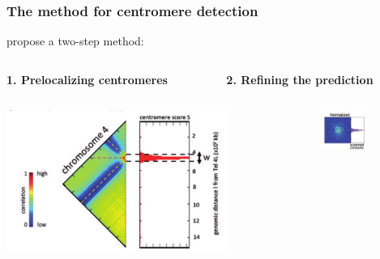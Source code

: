 \documentclass[xcolor=dvipsnames]{beamer}
\begin{document}
\begin{frame}
\frametitle{The \citet{marie-nelly:filling} method for centromere detection}

\citet{marie-nelly:filling} propose a two-step method:
\vspace{2em}

\begin{columns}
\begin{column}{0.5\textwidth}
\textbf{1. Prelocalizing centromeres}
\end{column}
\begin{column}{0.5\textwidth}
\textbf{2. Refining the prediction}
\end{column}
\end{columns}

\begin{columns}
\centering
\begin{column}{0.5\textwidth}
\begin{center}
\includegraphics[width=0.75\textwidth]{figures/marie_nelly_prelocation.png}
\end{center}
\end{column}
\begin{column}{0.5\textwidth}
\begin{center}
\includegraphics[width=0.5\textwidth]{figures/marie_nelly_step2.png}
\end{center}
\end{column}
\end{columns}

\end{frame}
\end{document}
